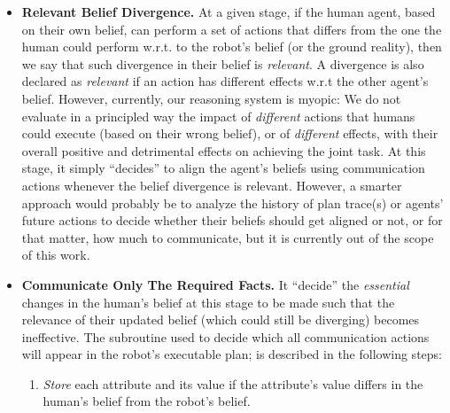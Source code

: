 \documentclass[letterpaper]{article} %
\begin{document}


\begin{itemize}
    \item \textbf{Relevant Belief Divergence.}
    At a given stage, if the human agent, based on their own belief, can perform a set of actions that differs from 
    the one 
    the human could perform w.r.t. to the robot's belief (or the ground reality), then we say that such divergence in their belief is \textit{relevant}.
    A divergence is also declared as \textit{relevant} if an action has different effects w.r.t the other agent's belief.
    However, currently, our reasoning system is myopic: We do not evaluate in a principled way the impact of \textit{different} actions that humans could execute (based on their wrong belief), or of \textit{different} effects, with their overall positive and detrimental effects on achieving the joint task. At this stage, it simply ``decides'' to align the agent's beliefs using communication actions whenever the belief divergence is relevant.
    However, a smarter approach would probably be to analyze the history of plan trace(s) or agents' future actions to decide whether their beliefs should get aligned or not, or for that matter, how much to communicate, but it is currently out of the scope of this work. 
    
    \item \textbf{Communicate Only The Required Facts.}
    It ``decide'' the \textit{essential} changes in the human's belief at this stage to be made such that the relevance of their updated belief (which could still be diverging) becomes ineffective. 
    The subroutine used to decide which all communication actions will appear in the robot's executable plan; is described in the following steps:
    \begin{enumerate}
        \item 
        \textit{Store} each attribute and its value if the attribute's value differs in the human's belief from the robot's belief. 
    

\end{enumerate}
\end{itemize}
\end{document}
